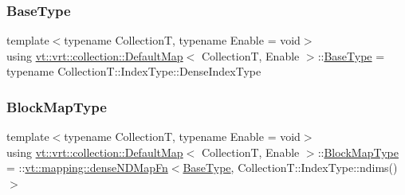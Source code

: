 \subsubsection{\texorpdfstring{Base\+Type}{BaseType}}
{\footnotesize\ttfamily template$<$typename CollectionT, typename Enable = void$>$ \\
using \hyperlink{structvt_1_1vrt_1_1collection_1_1_default_map}{vt\+::vrt\+::collection\+::\+Default\+Map}$<$ CollectionT, Enable $>$\+::\hyperlink{structvt_1_1vrt_1_1collection_1_1_default_map_base_a171c2e994a586fa5d8e1213f7ebfda95}{Base\+Type} =  typename Collection\+T\+::\+Index\+Type\+::\+Dense\+Index\+Type}

\mbox{\label{structvt_1_1vrt_1_1collection_1_1_default_map_a0784870e9ab02d89e2b9abe6ea539bbe}} 
\subsubsection{\texorpdfstring{Block\+Map\+Type}{BlockMapType}}
{\footnotesize\ttfamily template$<$typename CollectionT, typename Enable = void$>$ \\
using \hyperlink{structvt_1_1vrt_1_1collection_1_1_default_map}{vt\+::vrt\+::collection\+::\+Default\+Map}$<$ CollectionT, Enable $>$\+::\hyperlink{structvt_1_1vrt_1_1collection_1_1_default_map_a0784870e9ab02d89e2b9abe6ea539bbe}{Block\+Map\+Type} =  \+::\hyperlink{namespacevt_1_1mapping_a02a4066fb2101421d657a9f601cc9977}{vt\+::mapping\+::dense\+N\+D\+Map\+Fn}$<$\hyperlink{structvt_1_1vrt_1_1collection_1_1_default_map_base_a171c2e994a586fa5d8e1213f7ebfda95}{Base\+Type}, Collection\+T\+::\+Index\+Type\+::ndims()$>$}

\mbox{\label{structvt_1_1vrt_1_1collection_1_1_default_map_abec6478a6996d20fe301da1dfc1e232e}} 
